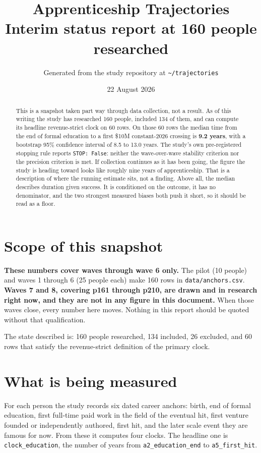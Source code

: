 \documentclass[11pt]{article}
\title{\bfseries Apprenticeship Trajectories\\[0.35em]
\large Interim status report at 160 people researched}
\author{\normalsize Generated from the study repository at \texttt{\textasciitilde/trajectories}}
\date{\normalsize 22 August 2026}
\begin{document}
\maketitle

\begin{abstract}
\noindent
This is a snapshot taken part way through data collection, not a result. As of
this writing the study has researched 160 people, included 134 of them, and can
compute its headline revenue-strict clock on 60 rows. On those 60 rows the
median time from the end of formal education to a first \$10M constant-2026
crossing is \textbf{9.2 years}, with a bootstrap 95\% confidence interval of
8.5 to 13.0 years. The study's own pre-registered stopping rule reports
\texttt{STOP: False}: neither the wave-over-wave stability criterion nor the
precision criterion is met. If collection continues as it has been going, the
figure the study is heading toward looks like roughly nine years of
apprenticeship. That is a description of where the running estimate sits, not a
finding. Above all, the median describes duration given success. It is
conditioned on the outcome, it has no denominator, and the two strongest
measured biases both push it short, so it should be read as a floor.
\end{abstract}

\section{Scope of this snapshot}

\textbf{These numbers cover waves through wave 6 only.} The pilot (10 people)
and waves 1 through 6 (25 people each) make 160 rows in
\texttt{data/anchors.csv}. \textbf{Waves 7 and 8, covering p161 through p210,
are drawn and in research right now, and they are not in any figure in this
document.} When those waves close, every number here moves. Nothing in this
report should be quoted without that qualification.

The state described is: 160 people researched, 134 included, 26 excluded, and
60 rows that satisfy the revenue-strict definition of the primary clock.

\section{What is being measured}

For each person the study records six dated career anchors: birth, end of
formal education, first full-time paid work in the field of the eventual hit,
first venture founded or independently authored, first hit, and the later scale
event they are famous for now. From these it computes four clocks. The headline
one is \texttt{clock\_education}, the number of years from
\texttt{a2\_education\_end} to \texttt{a5\_first\_hit}.
\end{document}
